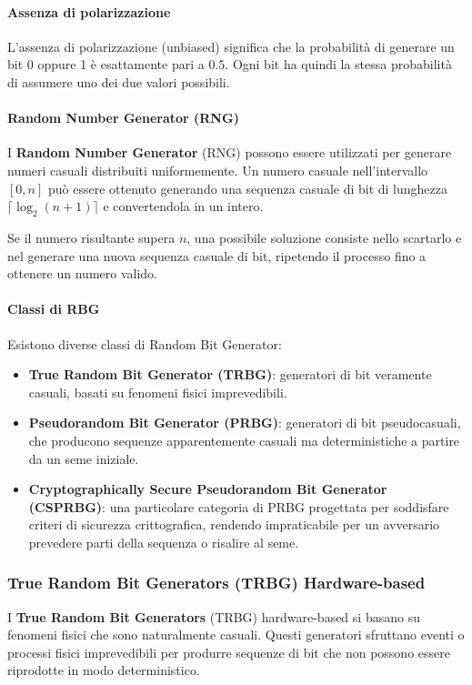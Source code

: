 \documentclass{report}
\begin{document}
\paragraph{Assenza di polarizzazione}
L'assenza di polarizzazione (unbiased) significa che la probabilità di generare un bit 0 oppure 1 è esattamente pari a \( 0.5 \). Ogni bit ha quindi la stessa probabilità di assumere uno dei due valori possibili.

\paragraph{Random Number Generator (RNG)}
I \textbf{Random Number Generator} (RNG) possono essere utilizzati per generare numeri casuali distribuiti uniformemente. Un numero casuale nell’intervallo \([0, n]\) può essere ottenuto generando una sequenza casuale di bit di lunghezza \( \lceil \log_2(n+1) \rceil \) e convertendola in un intero.

Se il numero risultante supera \( n \), una possibile soluzione consiste nello scartarlo e nel generare una nuova sequenza casuale di bit, ripetendo il processo fino a ottenere un numero valido.

\paragraph{Classi di RBG}
Esistono diverse classi di Random Bit Generator:
\begin{itemize}
    \item \textbf{True Random Bit Generator (TRBG)}: generatori di bit veramente casuali, basati su fenomeni fisici imprevedibili.
    \item \textbf{Pseudorandom Bit Generator (PRBG)}: generatori di bit pseudocasuali, che producono sequenze apparentemente casuali ma deterministiche a partire da un seme iniziale.
    \item \textbf{Cryptographically Secure Pseudorandom Bit Generator (CSPRBG)}: una particolare categoria di PRBG progettata per soddisfare criteri di sicurezza crittografica, rendendo impraticabile per un avversario prevedere parti della sequenza o risalire al seme.
\end{itemize}


\subsubsection{True Random Bit Generators (TRBG) Hardware-based}

I \textbf{True Random Bit Generators} (TRBG) hardware-based si basano su fenomeni fisici che sono naturalmente casuali. Questi generatori sfruttano eventi o processi fisici imprevedibili per produrre sequenze di bit che non possono essere riprodotte in modo deterministico.
\end{document}
